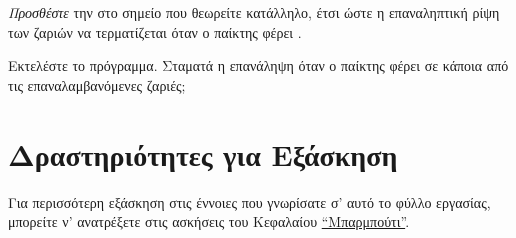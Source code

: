 \documentclass[a4paper,11pt,oneside]{book}
\begin{document}
\begin{step}
\emph{Προσθέστε} την  στο σημείο που θεωρείτε κατάλληλο, έτσι ώστε η επαναληπτική ρίψη των ζαριών να τερματίζεται όταν ο παίκτης φέρει .

Εκτελέστε το πρόγραμμα. Σταματά η επανάληψη όταν ο παίκτης φέρει  σε κάποια από τις επαναλαμβανόμενες ζαριές;

\marginnote[14pt]{\icondiscuss}
\dottedline
\end{step}

\section{Δραστηριότητες για Εξάσκηση}

%
Για περισσότερη εξάσκηση στις έννοιες που γνωρίσατε σ' αυτό το φύλλο εργασίας, μπορείτε ν' ανατρέξετε στις ασκήσεις του %
Κεφαλαίου \href{http://pythonies.mysch.gr/chapters/craps.pdf}{``Μπαρμπούτι''}.
\end{document}
